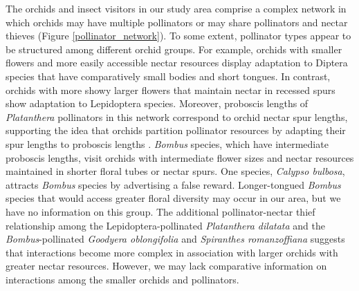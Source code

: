 \begin{multicols}{2}
The orchids and insect visitors in our study area comprise a complex
network in which orchids may have multiple pollinators or may share
pollinators and nectar thieves (Figure \ref{pollinator_network}). To some extent, pollinator
types appear to be structured among different orchid groups. For
example, orchids with smaller flowers and more easily accessible nectar
resources display adaptation to Diptera species that have comparatively
small bodies and short tongues. In contrast, orchids with more showy
larger flowers that maintain nectar in recessed spurs show adaptation to
Lepidoptera species. Moreover, proboscis lengths of \emph{Platanthera}
pollinators in this network correspond to orchid nectar spur lengths,
supporting the idea that orchids partition pollinator resources by
adapting their spur lengths to proboscis lengths \citep{HapemanInoue1997}. \emph{Bombus} species, which have intermediate proboscis lengths, visit
orchids with intermediate flower sizes and nectar resources maintained
in shorter floral tubes or nectar spurs. One species, \emph{Calypso
bulbosa}, attracts \emph{Bombus} species by advertising a false reward.
Longer-tongued \emph{Bombus} species that would access greater floral
diversity may occur in our area, but we have no information on this
group. The additional pollinator-nectar thief relationship among the
Lepidoptera-pollinated \emph{Platanthera dilatata} and the
\emph{Bombus}-pollinated \emph{Goodyera oblongifolia} and
\emph{Spiranthes romanzoffiana} suggests that interactions become more
complex in association with larger orchids with greater nectar
resources. However, we may lack comparative information on interactions
among the smaller orchids and pollinators.

\end{multicols}
